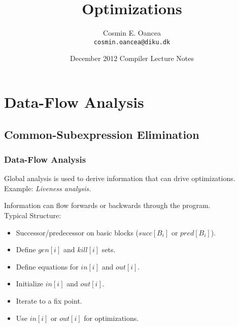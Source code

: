 \documentclass{beamer}
\title[Optimizations]{Optimizations}
\author[C.~Oancea]{Cosmin E. Oancea\\{\tt cosmin.oancea@diku.dk}}
\institute{Department of Computer Science (DIKU)\\University of Copenhagen}
\date[December 2012]{December 2012 Compiler Lecture Notes}
\begin{document}
\titleslide



\begin{frame}[fragile]
	\tableofcontents
\end{frame}

\section{Data-Flow Analysis}



\subsection{Common-Subexpression Elimination}


\begin{frame}[fragile,t]
    \frametitle{Data-Flow Analysis}

Global analysis is used to derive information that can drive
optimizations. Example: {\em Liveness analysis.}


\bigskip

Information can flow forwards or backwards through the program.\\
Typical Structure:\smallskip

\begin{itemize}
    \item Successor/predecessor on basic blocks ($succ[B_i]$ or $pred[B_i]$).\smallskip
    \item Define $gen[i]$ and $kill[i]$ sets.\smallskip
    \item Define equations for $in[i]$ and $out[i]$.\smallskip
    \item Initialize $in[i]$ and $out[i]$.\smallskip
    \item Iterate to a fix point.\smallskip
    \item Use $in[i]$ or $out[i]$ for optimizations.
\end{itemize}

\end{frame}
\end{document}
